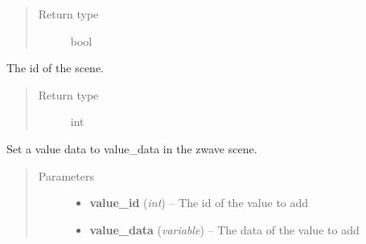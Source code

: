 \documentclass[letterpaper,10pt,english]{sphinxmanual}
\begin{document}
\begin{fulllineitems}
\begin{fulllineitems}
\begin{quote}
\begin{description}
\item[{Return type}] \leavevmode
bool

\end{description}\end{quote}

\end{fulllineitems}


\begin{fulllineitems}
\label{scene:openzwave.scene.ZWaveScene.scene_id}
The id of the scene.
\begin{quote}\begin{description}
\item[{Return type}] \leavevmode
int

\end{description}\end{quote}

\end{fulllineitems}


\begin{fulllineitems}
\label{scene:openzwave.scene.ZWaveScene.set_value}
Set a value data to value\_data in the zwave scene.
\begin{quote}\begin{description}
\item[{Parameters}] \leavevmode\begin{itemize}
\item {} 
\textbf{value\_id} (\emph{int}) -- The id of the value to add

\item {} 
\textbf{value\_data} (\emph{variable}) -- The data of the value to add

\end{itemize}

\end{description}\end{quote}

\end{fulllineitems}


\end{fulllineitems}
\end{document}
